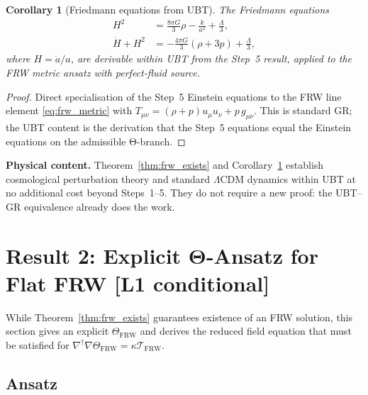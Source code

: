 \documentclass[12pt,a4paper]{article}
\newtheorem{corollary}[theorem]{Corollary}
\theoremstyle{definition}
\theoremstyle{remark}
\begin{document}
\begin{corollary}[Friedmann equations from UBT]
\label{cor:friedmann}
The Friedmann equations
\begin{align}
  H^2 &= \frac{8\pi G}{3}\rho - \frac{k}{a^2} + \frac{\Lambda}{3},
  \label{eq:friedmann1} \\
  \dot{H} + H^2 &= -\frac{4\pi G}{3}\!\left(\rho + 3p\right) + \frac{\Lambda}{3},
  \label{eq:friedmann2}
\end{align}
where $H=\dot{a}/a$, are derivable within UBT from the Step~5 result, applied to
the FRW metric ansatz with perfect-fluid source.
\end{corollary}

\begin{proof}
Direct specialisation of the Step~5 Einstein equations to the FRW line element
\eqref{eq:frw_metric} with $T_{\mu\nu} = (\rho+p)u_\mu u_\nu + p\,g_{\mu\nu}$.
This is standard GR; the UBT content is the derivation that the Step~5 equations
equal the Einstein equations on the admissible Θ-branch.
\end{proof}

\begin{insightbox}
  \textbf{Physical content.} Theorem~\ref{thm:frw_exists} and
  Corollary~\ref{cor:friedmann} establish cosmological perturbation theory and
  standard $\Lambda$CDM dynamics within UBT at no additional cost beyond
  Steps~1--5.  They do not require a new proof: the UBT--GR equivalence
  already does the work.
\end{insightbox}

\section{Result 2: Explicit Θ-Ansatz for Flat FRW [L1 conditional]}
\label{sec:ansatz}

While Theorem~\ref{thm:frw_exists} guarantees existence of an FRW solution,
this section gives an explicit $\Theta_{\mathrm{FRW}}$ and derives the reduced
field equation that must be satisfied for
$\nabla^\dagger\nabla\Theta_{\mathrm{FRW}}=\kappa\mathcal{T}_{\mathrm{FRW}}$.

\subsection{Ansatz}
\end{document}
